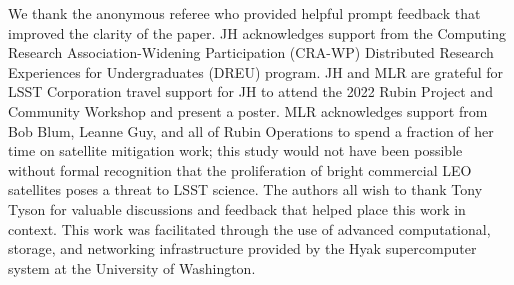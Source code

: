 \documentclass[twocolumn]{aastex631}
\begin{document}


\begin{acknowledgments}
We thank the anonymous referee who provided helpful prompt feedback that improved the clarity of the paper.
JH acknowledges support from the Computing Research Association-Widening Participation (CRA-WP) Distributed Research Experiences for Undergraduates (DREU) program.
JH and MLR are grateful for LSST Corporation travel support for JH to attend the 2022 Rubin Project and Community Workshop and present a poster.
MLR acknowledges support from Bob Blum, Leanne Guy, and all of Rubin Operations to spend a fraction of her time on satellite mitigation work; this study would not have been possible without formal recognition that the proliferation of bright commercial LEO satellites poses a threat to LSST science.
The authors all wish to thank Tony Tyson for valuable discussions and feedback that helped place this work in context.
This work was facilitated through the use of advanced computational, storage, and networking infrastructure provided by the Hyak supercomputer system at the University of Washington.
\end{acknowledgments}


{}

\end{document}
